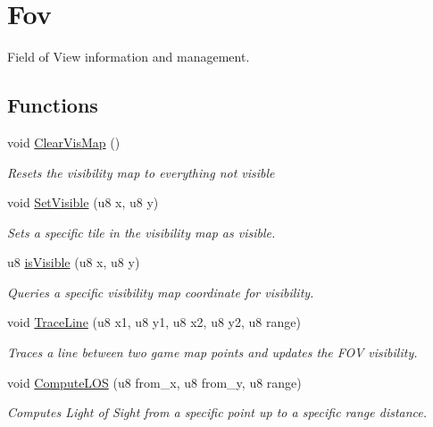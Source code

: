 \hypertarget{group__fov}{}\section{Fov}
\label{group__fov}


Field of View information and management.  


\subsection*{Functions}
\begin{DoxyCompactItemize}
\item 
\mbox{\label{group__fov_gaa8b3a2290d82ee3c712f6d8eeb0707b5}} 
void \mbox{\hyperlink{group__fov_gaa8b3a2290d82ee3c712f6d8eeb0707b5}{Clear\+Vis\+Map}} ()
\begin{DoxyCompactList}\small\item\em Resets the visibility map to everything {\itshape not visible} \end{DoxyCompactList}\item 
void \mbox{\hyperlink{group__fov_ga6ffddffaee8d99436812e5eea6590d5c}{Set\+Visible}} (u8 x, u8 y)
\begin{DoxyCompactList}\small\item\em Sets a specific tile in the visibility map as visible. \end{DoxyCompactList}\item 
u8 \mbox{\hyperlink{group__fov_ga131c45868e1d0ec18394f271b65a7db6}{is\+Visible}} (u8 x, u8 y)
\begin{DoxyCompactList}\small\item\em Queries a specific visibility map coordinate for visibility. \end{DoxyCompactList}\item 
void \mbox{\hyperlink{group__fov_ga2f946adf9ec7ffa8fc9fe95e76945c29}{Trace\+Line}} (u8 x1, u8 y1, u8 x2, u8 y2, u8 range)
\begin{DoxyCompactList}\small\item\em Traces a line between two game map points and updates the F\+OV visibility. \end{DoxyCompactList}\item 
void \mbox{\hyperlink{group__fov_gad4147656708c4dad3847f926aa415563}{Compute\+L\+OS}} (u8 from\+\_\+x, u8 from\+\_\+y, u8 range)
\begin{DoxyCompactList}\small\item\em Computes {\itshape Light of Sight} from a specific point up to a specific range distance. \end{DoxyCompactList}\end{DoxyCompactItemize}


